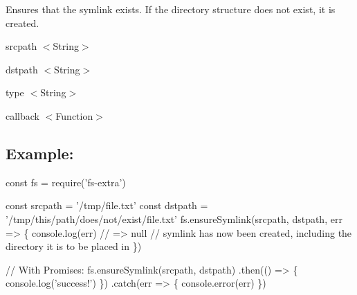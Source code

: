 Ensures that the symlink exists. If the directory structure does not exist, it is created.


\begin{DoxyItemize}
\item {\ttfamily srcpath} {\ttfamily $<$String$>$}
\item {\ttfamily dstpath} {\ttfamily $<$String$>$}
\item {\ttfamily type} {\ttfamily $<$String$>$}
\item {\ttfamily callback} {\ttfamily $<$Function$>$}
\end{DoxyItemize}

\subsection*{Example\+:}


\begin{DoxyCode}
const fs = require('fs-extra')

const srcpath = '/tmp/file.txt'
const dstpath = '/tmp/this/path/does/not/exist/file.txt'
fs.ensureSymlink(srcpath, dstpath, err => \{
  console.log(err) // => null
  // symlink has now been created, including the directory it is to be placed in
\})

// With Promises:
fs.ensureSymlink(srcpath, dstpath)
.then(() => \{
  console.log('success!')
\})
.catch(err => \{
  console.error(err)
\})
\end{DoxyCode}
 